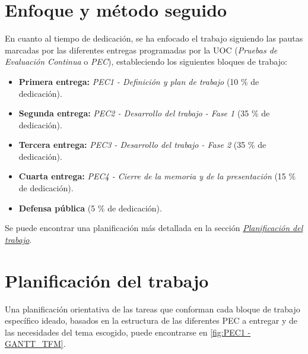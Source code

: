 \documentclass[IB,BIB]{TFUOC}%
\begin{document}
\section{Enfoque y método seguido}
\label{sec:PEC1 - Enfoque y método seguido}

En cuanto al tiempo de dedicación, se ha enfocado el trabajo siguiendo las pautas marcadas por las diferentes entregas programadas por la UOC (\textit{Pruebas de Evaluación Continua} o \textit{PEC}), estableciendo los siguientes bloques de trabajo:

\begin{itemize}
    \item \textbf{Primera entrega:} \textit{PEC1 - Definición y plan de trabajo} (10 \% de dedicación).
    \item \textbf{Segunda entrega:} \textit{PEC2 - Desarrollo del trabajo - Fase 1} (35 \% de dedicación).
    \item \textbf{Tercera entrega:} \textit{PEC3 - Desarrollo del trabajo - Fase 2} (35 \% de dedicación).
    \item \textbf{Cuarta entrega:} \textit{PEC4 - Cierre de la memoria y de la presentación} (15 \% de dedicación).
    \item \textbf{Defensa pública} (5 \% de dedicación).
\end{itemize}

Se puede encontrar una planificación más detallada en la sección \textit{\hyperref[sec:PEC1 - Planificación del trabajo]{Planificación del trabajo}}.


\newpage

\section{Planificación del trabajo}
\label{sec:PEC1 - Planificación del trabajo}

Una planificación orientativa de las tareas que conforman cada bloque de trabajo específico ideado, basados en la estructura de las diferentes PEC a entregar y de las necesidades del tema escogido, puede encontrarse en \ref{fig:PEC1 - GANTT_TFM}. 

\end{document}
